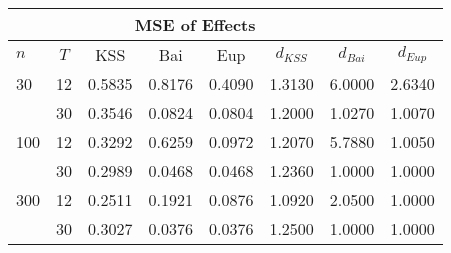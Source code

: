 \begin{tabular}{lccccccc} 
\hline \multicolumn{7}{c}{MSE of Effects} \\ \hline 
$n$ & $T$ & KSS & Bai & Eup & $d_{KSS}$ & $d_{Bai}$ & $d_{Eup}$ \\
\hline
30 & 12 &  0.5835  &  0.8176  &  0.4090  &  1.3130  &  6.0000  &  2.6340  \\
& 30 &  0.3546  &  0.0824  &  0.0804  &  1.2000  &  1.0270  &  1.0070  \\
100 & 12 &  0.3292  &  0.6259  &  0.0972  &  1.2070  &  5.7880  &  1.0050  \\
& 30 &  0.2989  &  0.0468  &  0.0468  &  1.2360  &  1.0000  &  1.0000  \\
300 & 12 &  0.2511  &  0.1921  &  0.0876  &  1.0920  &  2.0500  &  1.0000  \\
& 30 &  0.3027  &  0.0376  &  0.0376  &  1.2500  &  1.0000  &  1.0000  \\
\end{tabular} 
